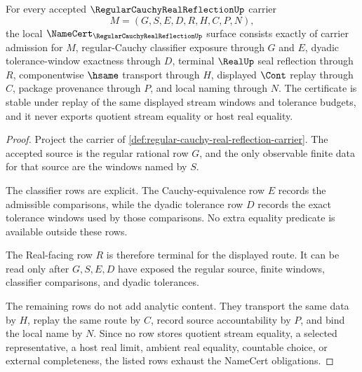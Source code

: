 \begin{theorem}
\label{thm:regular-cauchy-real-reflection-namecert-obligations}
For every accepted $\RegularCauchyRealReflectionUp$ carrier
$$
M=(G,S,E,D,R,H,C,P,N),
$$
the local $\NameCert_{\RegularCauchyRealReflectionUp}$ surface consists exactly of carrier admission for $M$, regular-Cauchy classifier exposure through $G$ and $E$, dyadic tolerance-window exactness through $D$, terminal $\RealUp$ seal reflection through $R$, componentwise $\hsame$ transport through $H$, displayed $\Cont$ replay through $C$, package provenance through $P$, and local naming through $N$. The certificate is stable under replay of the same displayed stream windows and tolerance budgets, and it never exports quotient stream equality or host real equality.
\end{theorem}
\begin{proof}
Project the carrier of \autoref{def:regular-cauchy-real-reflection-carrier}. The accepted source is the regular rational row $G$, and the only observable finite data for that source are the windows named by $S$.

The classifier rows are explicit. The Cauchy-equivalence row $E$ records the admissible comparisons, while the dyadic tolerance row $D$ records the exact tolerance windows used by those comparisons. No extra equality predicate is available outside these rows.

The Real-facing row $R$ is therefore terminal for the displayed route. It can be read only after $G,S,E,D$ have exposed the regular source, finite windows, classifier comparisons, and dyadic tolerances.

The remaining rows do not add analytic content. They transport the same data by $H$, replay the same route by $C$, record source accountability by $P$, and bind the local name by $N$. Since no row stores quotient stream equality, a selected representative, a host real limit, ambient real equality, countable choice, or external completeness, the listed rows exhaust the NameCert obligations.
\end{proof}


